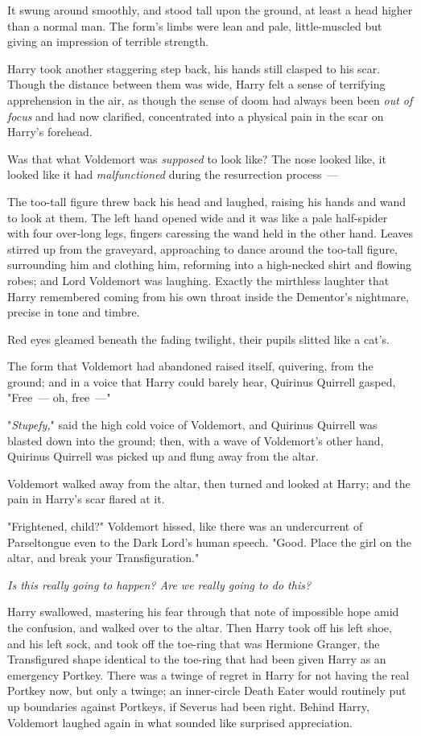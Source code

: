 It swung around smoothly, and stood tall upon the ground, at least a head
higher than a normal man. The form's limbs were lean and pale, little-muscled
but giving an impression of terrible strength.

Harry took another staggering step back, his hands still clasped to his scar.
Though the distance between them was wide, Harry felt a sense of terrifying
apprehension in the air, as though the sense of doom had always been been
\emph{out of focus} and had now clarified, concentrated into a physical pain in
the scar on Harry's forehead.

Was that what Voldemort was \emph{supposed} to look like? The nose looked like,
it looked like it had \emph{malfunctioned} during the resurrection process~---

The too-tall figure threw back his head and laughed, raising his hands and wand
to look at them. The left hand opened wide and it was like a pale half-spider
with four over-long legs, fingers caressing the wand held in the other hand.
Leaves stirred up from the graveyard, approaching to dance around the too-tall
figure, surrounding him and clothing him, reforming into a high-necked shirt
and flowing robes; and Lord Voldemort was laughing. Exactly the mirthless
laughter that Harry remembered coming from his own throat inside the Dementor's
nightmare, precise in tone and timbre.

Red eyes gleamed beneath the fading twilight, their pupils slitted like a cat's.

The form that Voldemort had abandoned raised itself, quivering, from the
ground; and in a voice that Harry could barely hear, Quirinus Quirrell gasped,
"Free~--- oh, free~---"

"\emph{Stupefy,}" said the high cold voice of Voldemort, and Quirinus Quirrell
was blasted down into the ground; then, with a wave of Voldemort's other hand,
Quirinus Quirrell was picked up and flung away from the altar.

Voldemort walked away from the altar, then turned and looked at Harry; and the
pain in Harry's scar flared at it.

"Frightened, child?" Voldemort hissed, like there was an undercurrent of
Parseltongue even to the Dark Lord's human speech. "Good. Place the girl on the
altar, and break your Transfiguration." 

\emph{Is this really going to happen? Are we really going to do this?}

Harry swallowed, mastering his fear through that note of impossible hope amid
the confusion, and walked over to the altar. Then Harry took off his left shoe,
and his left sock, and took off the toe-ring that was Hermione Granger, the
Transfigured shape identical to the toe-ring that had been given Harry as an
emergency Portkey. There was a twinge of regret in Harry for not having the
real Portkey now, but only a twinge; an inner-circle Death Eater would
routinely put up boundaries against Portkeys, if Severus had been right. Behind
Harry, Voldemort laughed again in what sounded like surprised appreciation.

